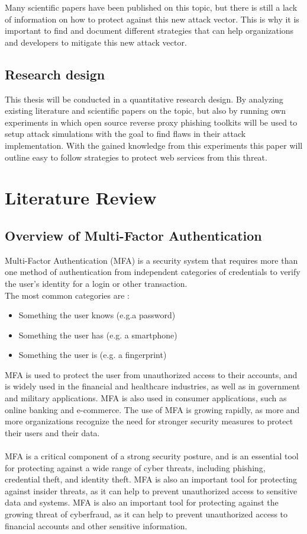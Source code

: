 \documentclass[12pt]{scrbook}
\begin{document}
Many scientific papers have been published on this
topic, but there is still a lack of information on how to protect against this
new attack vector. This is why it is important to find and document different
strategies that can help organizations and developers to mitigate this new
attack vector.

\section{Research design} This thesis will be conducted in a quantitative
research design. By analyzing existing literature and scientific papers on the
topic, but also by running own experiments in which open source reverse proxy
phishing toolkits will be used to setup attack simulations with the goal to find
flaws in their attack implementation. With the gained knowledge from this
experiments this paper will outline easy to follow strategies to protect web
services from this threat.

\newpage \chapter{Literature Review} \section{Overview of Multi-Factor
Authentication}

Multi-Factor Authentication (MFA) is a security system that requires more than
one method of authentication from independent categories of credentials to
verify the user's identity for a login or other transaction.\\The most common
categories are \cite{mfa}:
\begin{itemize}
  \item Something the user knows (e.g.a password)
  \item Something the user has (e.g. a smartphone)
  \item Something the user is (e.g. a fingerprint)
\end{itemize}

MFA is used to
protect the user from unauthorized access to their accounts, and is widely
used in the financial and healthcare industries, as well as in government and
military applications. MFA is also used in consumer applications, such as
online banking and e-commerce. The use of MFA is growing rapidly, as more and
more organizations recognize the need for stronger security measures to
protect their users and their data.\\ \\MFA is a critical component of a
strong security posture, and is an essential tool for protecting against a
wide range of cyber threats, including phishing, credential theft, and
identity theft. MFA is also an important tool for protecting against insider
threats, as it can help to prevent unauthorized access to sensitive data and
systems. MFA is also an important tool for protecting against the growing
threat of cyberfraud, as it can help to prevent unauthorized access to
financial accounts and other sensitive information.
\end{document}
